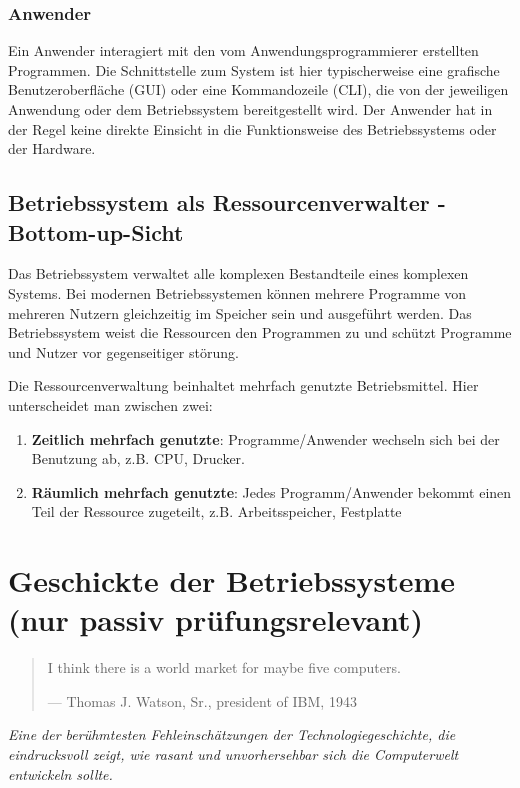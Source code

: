 \subsubsection*{Anwender}
Ein Anwender interagiert mit den vom Anwendungsprogrammierer erstellten Programmen. Die Schnittstelle zum System ist hier typischerweise eine grafische Benutzeroberfläche (GUI) oder eine Kommandozeile (CLI), die von der jeweiligen Anwendung oder dem Betriebssystem bereitgestellt wird. Der Anwender hat in der Regel keine direkte Einsicht in die Funktionsweise des Betriebssystems oder der Hardware.

\subsection{Betriebssystem als Ressourcenverwalter - Bottom-up-Sicht}

Das Betriebssystem verwaltet alle komplexen Bestandteile eines komplexen
Systems. Bei modernen Betriebssystemen können mehrere Programme von mehreren
Nutzern gleichzeitig im Speicher sein und ausgeführt werden. Das Betriebssystem
weist die Ressourcen den Programmen zu und schützt Programme und Nutzer vor
gegenseitiger störung.

Die Ressourcenverwaltung beinhaltet mehrfach genutzte Betriebsmittel. Hier
unterscheidet man zwischen zwei:

\begin{enumerate}
    \item \textbf{Zeitlich mehrfach genutzte}: Programme/Anwender wechseln sich bei der Benutzung ab, z.B. CPU, Drucker.
    \item \textbf{Räumlich mehrfach genutzte}: Jedes Programm/Anwender bekommt einen Teil der Ressource zugeteilt, z.B. Arbeitsspeicher, Festplatte
\end{enumerate}

\section{Geschickte der Betriebssysteme (nur passiv prüfungsrelevant)}

\begin{quotation}
    I think there is a world market for maybe five computers.

    \medskip
    \noindent
    --- Thomas J. Watson, Sr., president of IBM, 1943
\end{quotation}
\textit{Eine der berühmtesten Fehleinschätzungen der Technologiegeschichte, die eindrucksvoll zeigt, wie rasant und unvorhersehbar sich die Computerwelt entwickeln sollte.}

